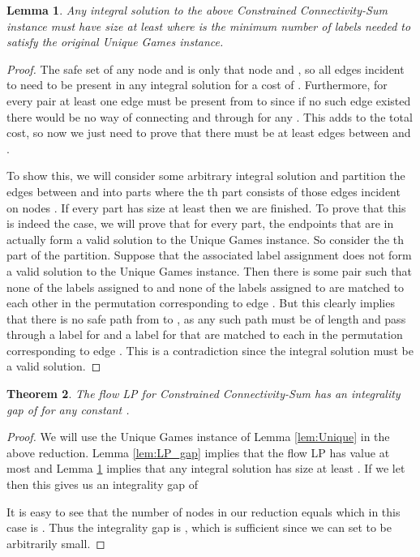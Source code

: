 \documentclass[11pt,letterpaper]{article}
\newtheorem{theorem}{Theorem}[section]
\newtheorem{lemma}[theorem]{Lemma}
\theoremstyle{definition}
\begin{document}
  \begin{lemma} \label{lem:IP_gap} Any integral solution to the above
    {\sc Constrained Connectivity-Sum} instance must have size at least  where  is the minimum number of labels
    needed to satisfy the original Unique Games instance.
  \end{lemma}
  \begin{proof}
    The safe set of any node and  is only that node and , so all
    edges incident to  need to be present in any integral solution
    for a cost of .  Furthermore, for
    every pair  at least one edge must be present from
     to  since if no such edge
    existed there would be no way of connecting  and 
    through  for any .  This adds  to the total cost, so now we just need to prove that
    there must be at least  edges between  and .

    To show this, we will consider some arbitrary integral solution
    and partition the edges between  and  into  parts where the th part consists of
    those edges incident on nodes .  If every
    part has size at least  then we are finished.  To prove
    that this is indeed the case, we will prove that for every part,
    the endpoints that are in  actually form a
    valid solution to the Unique Games instance.  So consider the
    th part of the partition.  Suppose that the associated label
    assignment does not form a valid solution to the Unique Games
    instance.  Then there is some pair  such that none of
    the labels assigned to  and none of the labels assigned to 
    are matched to each other in the permutation corresponding to edge
    .  But this clearly implies that there is no safe path
    from  to , as any such path must be of length  and
    pass through a label for  and a label for  that are matched
    to each in the permutation corresponding to edge .  This
    is a contradiction since the integral solution must be a valid
    solution.
  \end{proof}



  \begin{theorem} \label{thm:gap} The flow LP for {\sc Constrained Connectivity-Sum} has an integrality gap
    of  for any constant .
  \end{theorem}

  \begin{proof}
    We will use the Unique Games instance of Lemma \ref{lem:Unique}
    in the above reduction.  Lemma \ref{lem:LP_gap} implies that the
    flow LP has value at most  and Lemma
    \ref{lem:IP_gap} implies that any integral solution has size at
    least .  If we let  then this gives us an
    integrality gap of
  
  It is easy to see that the number of nodes  in our reduction
  equals  which in this case is
  .  Thus the integrality
  gap is , which is
  sufficient since we can set  to be arbitrarily small.
\end{proof}
\end{document}
